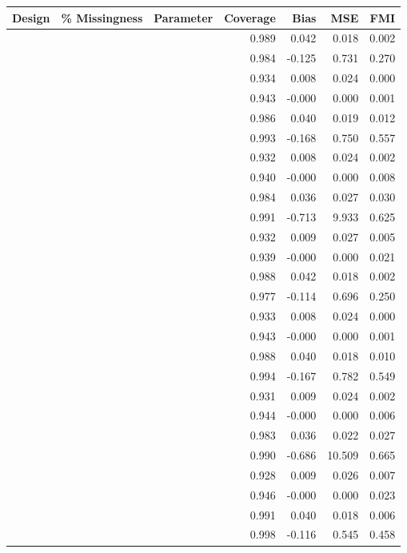 \documentclass{svjour3}                     %
\begin{document}
\begin{table}[ht]
\centering
\begin{tabular}{lllrrrr}
  \hline
Design & \% Missingness  & Parameter & Coverage & Bias & MSE & FMI \\ 
  \hline
 &  &  & 0.989 & 0.042 & 0.018 & 0.002 \\ 
   &  &  & 0.984 & -0.125 & 0.731 & 0.270 \\ 
   &  &  & 0.934 & 0.008 & 0.024 & 0.000 \\ 
   &  &  & 0.943 & -0.000 & 0.000 & 0.001 \\ 
   \hline
   &  &  & 0.986 & 0.040 & 0.019 & 0.012 \\ 
   &  &  & 0.993 & -0.168 & 0.750 & 0.557 \\ 
   &  &  & 0.932 & 0.008 & 0.024 & 0.002 \\ 
   &  &  & 0.940 & -0.000 & 0.000 & 0.008 \\ 
   \hline
   &  &  & 0.984 & 0.036 & 0.027 & 0.030 \\ 
   &  &  & 0.991 & -0.713 & 9.933 & 0.625 \\ 
   &  &  & 0.932 & 0.009 & 0.027 & 0.005 \\ 
   &  &  & 0.939 & -0.000 & 0.000 & 0.021 \\ 
   \hline
   &  &  & 0.988 & 0.042 & 0.018 & 0.002 \\ 
   &  &  & 0.977 & -0.114 & 0.696 & 0.250 \\ 
   &  &  & 0.933 & 0.008 & 0.024 & 0.000 \\ 
   &  &  & 0.943 & -0.000 & 0.000 & 0.001 \\ 
   \hline
   &  &  & 0.988 & 0.040 & 0.018 & 0.010 \\ 
   &  &  & 0.994 & -0.167 & 0.782 & 0.549 \\ 
   &  &  & 0.931 & 0.009 & 0.024 & 0.002 \\ 
   &  &  & 0.944 & -0.000 & 0.000 & 0.006 \\ 
   \hline
   &  &  & 0.983 & 0.036 & 0.022 & 0.027 \\ 
   &  &  & 0.990 & -0.686 & 10.509 & 0.665 \\ 
   &  &  & 0.928 & 0.009 & 0.026 & 0.007 \\ 
   &  &  & 0.946 & -0.000 & 0.000 & 0.023 \\ 
   \hline
   &  &  & 0.991 & 0.040 & 0.018 & 0.006 \\ 
   &  &  & 0.998 & -0.116 & 0.545 & 0.458 \\ 

\end{tabular}
\end{table}
\end{document}

